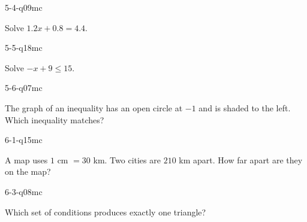 \begin{practiceQuestion}{5-4-q09}{mc}
\begin{questionText}
Solve $1.2x + 0.8 = 4.4$.
\end{questionText}
\end{practiceQuestion}

\begin{practiceQuestion}{5-5-q18}{mc}
\begin{questionText}
Solve $-x + 9 \leq 15$.
\end{questionText}
\end{practiceQuestion}

\begin{practiceQuestion}{5-6-q07}{mc}
\begin{questionText}
The graph of an inequality has an open circle at $-1$ and is shaded to the left. Which inequality matches?
\end{questionText}
\end{practiceQuestion}

\begin{practiceQuestion}{6-1-q15}{mc}
\begin{questionText}
A map uses $1$ cm $= 30$ km. Two cities are $210$ km apart. How far apart are they on the map?
\end{questionText}
\end{practiceQuestion}

\begin{practiceQuestion}{6-3-q08}{mc}
\begin{questionText}
Which set of conditions produces exactly one triangle?
\end{questionText}
\end{practiceQuestion}

